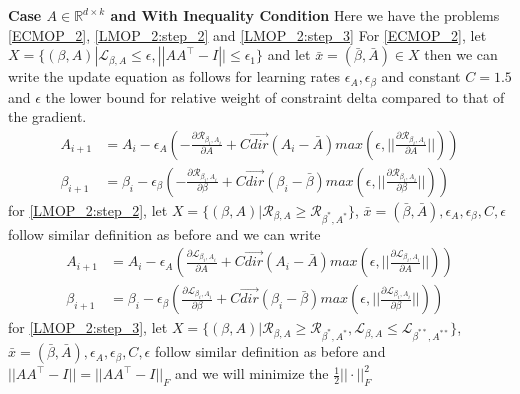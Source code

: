 \newline \textbf{Case $A \in \mathbb{R}^{d \times k}$ and With Inequality Condition}
\newline Here we have the problems \ref{ECMOP_2}, \ref{LMOP_2:step_2} and \ref{LMOP_2:step_3}
\newline For \ref{ECMOP_2}, let $X = \{(\beta, A) | \mathcal{L}_{\beta, A} \le \epsilon, ||AA^\top - I|| \le \epsilon_1\}$ and let $\bar{x} = (\bar{\beta},\bar{A}) \in X$ then we can write the update equation as follows for learning rates $\epsilon_A,\epsilon_{\beta}$ and constant $C=1.5$ and $\epsilon$ the lower bound for relative weight of constraint delta compared to that of the gradient.
\begin{equation}
\begin{aligned}
A_{i+1} &= A_{i} - \epsilon_A ( -\frac{\partial \mathcal{R}_{\beta_i, A_i}}{\partial A} + C \vec{dir}(A_i-\bar{A}) max(\epsilon,||\frac{\partial \mathcal{R}_{\beta_i, A_i}}{\partial A}||))\\
\beta_{i+1} &= \beta_{i} - \epsilon_{\beta} ( -\frac{\partial \mathcal{R}_{\beta_i, A_i}}{\partial \beta} + C \vec{dir}(\beta_i-\bar{\beta}) max(\epsilon,||\frac{\partial \mathcal{R}_{\beta_i, A_i}}{\partial \beta}||))
\end{aligned}    
\end{equation}
\newline for \ref{LMOP_2:step_2}, let $X = \{(\beta, A) | \mathcal{R}_{\beta, A} \ge \mathcal{R}_{\beta^{*}, A^{*}}\}$, $\bar{x} = (\bar{\beta},\bar{A}), \epsilon_A, \epsilon_{\beta}, C, \epsilon$ follow similar definition as before and we can write
\begin{equation}
\begin{aligned}
A_{i+1} &= A_{i} - \epsilon_A ( \frac{\partial \mathcal{L}_{\beta_i, A_i}}{\partial A} + C \vec{dir}(A_i-\bar{A}) max(\epsilon,||\frac{\partial \mathcal{L}_{\beta_i, A_i}}{\partial A}||))\\
\beta_{i+1} &= \beta_{i} - \epsilon_{\beta} ( \frac{\partial \mathcal{L}_{\beta_i, A_i}}{\partial \beta} + C \vec{dir}(\beta_i-\bar{\beta}) max(\epsilon,||\frac{\partial \mathcal{L}_{\beta_i, A_i}}{\partial \beta}||))
\end{aligned}    
\end{equation}
\newline for \ref{LMOP_2:step_3}, let $X = \{(\beta, A) | \mathcal{R}_{\beta, A} \ge \mathcal{R}_{\beta^{*}, A^{*}}, \mathcal{L}_{\beta, A} \le \mathcal{L}_{\beta^{**}, A^{**}}\}$, $\bar{x} = (\bar{\beta},\bar{A}), \epsilon_A, \epsilon_{\beta}, C, \epsilon$ follow similar definition as before and $|| AA^\top -I|| = || AA^\top -I||_F$ and we will minimize the $\frac{1}{2}||\cdot||^2_F$
